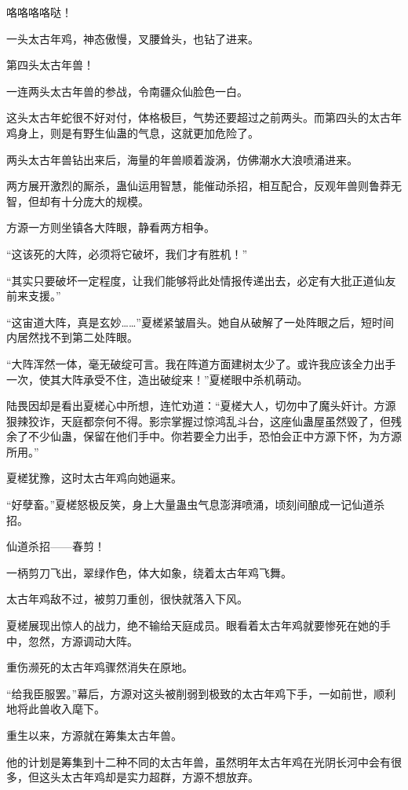\begin{this_body}
咯咯咯咯哒！

一头太古年鸡，神态傲慢，叉腰耸头，也钻了进来。

第四头太古年兽！

一连两头太古年兽的参战，令南疆众仙脸色一白。

这头太古年蛇很不好对付，体格极巨，气势还要超过之前两头。而第四头的太古年鸡身上，则是有野生仙蛊的气息，这就更加危险了。

两头太古年兽钻出来后，海量的年兽顺着漩涡，仿佛潮水大浪喷涌进来。

两方展开激烈的厮杀，蛊仙运用智慧，能催动杀招，相互配合，反观年兽则鲁莽无智，但却有十分庞大的规模。

方源一方则坐镇各大阵眼，静看两方相争。

“这该死的大阵，必须将它破坏，我们才有胜机！”

“其实只要破坏一定程度，让我们能够将此处情报传递出去，必定有大批正道仙友前来支援。”

“这宙道大阵，真是玄妙……”夏槎紧皱眉头。她自从破解了一处阵眼之后，短时间内居然找不到第二处阵眼。

“大阵浑然一体，毫无破绽可言。我在阵道方面建树太少了。或许我应该全力出手一次，使其大阵承受不住，造出破绽来！”夏槎眼中杀机萌动。

陆畏因却是看出夏槎心中所想，连忙劝道：“夏槎大人，切勿中了魔头奸计。方源狠辣狡诈，天庭都奈何不得。影宗掌握过惊鸿乱斗台，这座仙蛊屋虽然毁了，但残余了不少仙蛊，保留在他们手中。你若要全力出手，恐怕会正中方源下怀，为方源所用。”

夏槎犹豫，这时太古年鸡向她逼来。

“好孽畜。”夏槎怒极反笑，身上大量蛊虫气息澎湃喷涌，顷刻间酿成一记仙道杀招。

仙道杀招——春剪！

一柄剪刀飞出，翠绿作色，体大如象，绕着太古年鸡飞舞。

太古年鸡敌不过，被剪刀重创，很快就落入下风。

夏槎展现出惊人的战力，绝不输给天庭成员。眼看着太古年鸡就要惨死在她的手中，忽然，方源调动大阵。

重伤濒死的太古年鸡骤然消失在原地。

“给我臣服罢。”幕后，方源对这头被削弱到极致的太古年鸡下手，一如前世，顺利地将此兽收入麾下。

重生以来，方源就在筹集太古年兽。

他的计划是筹集到十二种不同的太古年兽，虽然明年太古年鸡在光阴长河中会有很多，但这头太古年鸡却是实力超群，方源不想放弃。


\end{this_body}
